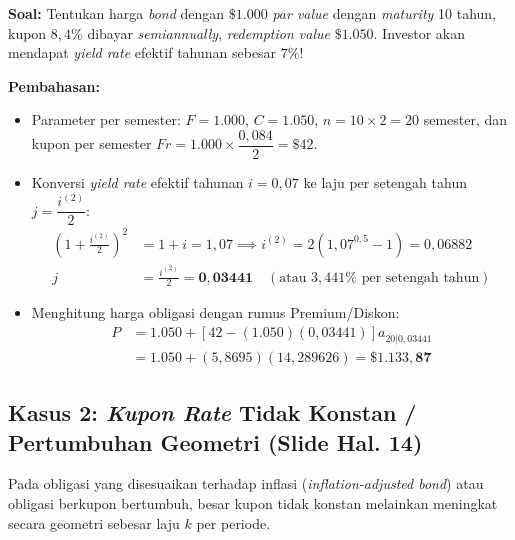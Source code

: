 \documentclass[11pt,a4paper]{article}
\begin{document}
\begin{examplebox}
\textbf{Soal:} Tentukan harga \textit{bond} dengan $\$1.000$ \textit{par value} dengan \textit{maturity} 10 tahun, kupon $8{,}4\%$ dibayar \textit{semiannually}, \textit{redemption value} $\$1.050$. Investor akan mendapat \textit{yield rate} efektif tahunan sebesar $7\%$!

\tcblower
\textbf{Pembahasan:}
\begin{itemize}[topsep=2pt, itemsep=2pt]
    \item Parameter per semester: $F = 1.000$, $C = 1.050$, $n = 10 \times 2 = 20$ semester, dan kupon per semester $Fr = 1.000 \times \dfrac{0{,}084}{2} = \$42$.
    \item Konversi \textit{yield rate} efektif tahunan $i = 0{,}07$ ke laju per setengah tahun $j = \dfrac{i^{(2)}}{2}$:
    \begin{align*}
        \left(1 + \frac{i^{(2)}}{2}\right)^2 &= 1 + i = 1{,}07 \implies i^{(2)} = 2\left(1{,}07^{0{,}5} - 1\right) = 0{,}06882 \\
        j &= \frac{i^{(2)}}{2} = \mathbf{0{,}03441} \quad (\text{atau } 3{,}441\% \text{ per setengah tahun})
    \end{align*}
    \item Menghitung harga obligasi dengan rumus Premium/Diskon:
    \begin{align*}
        P &= 1.050 + \left[42 - (1.050)(0{,}03441)\right] a_{\overline{20}|0{,}03441} \\
          &= 1.050 + (5{,}8695)(14{,}289626) = \mathbf{\$1.133{,}87}
    \end{align*}
\end{itemize}
\end{examplebox}

\subsection{Kasus 2: \textit{Kupon Rate} Tidak Konstan / Pertumbuhan Geometri (Slide Hal. 14)}

Pada obligasi yang disesuaikan terhadap inflasi (\textit{inflation-adjusted bond}) atau obligasi berkupon bertumbuh, besar kupon tidak konstan melainkan meningkat secara geometri sebesar laju $k$ per periode.
\end{document}
